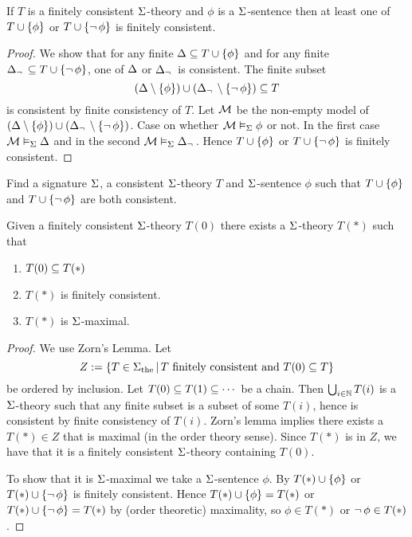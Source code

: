 \begin{lem}
    If $T$ is a finitely consistent $\Sigma$-theory 
    and $\phi$ is a $\Sigma$-sentence then at least one of
    $T \cup \left\{\phi\right\}$ or $T \cup \left\{\neg\, \phi\right\}$ is finitely consistent.
\end{lem}
\begin{proof}
    We show that for any finite $\Delta \subseteq T \cup \left\{\phi\right\}$ and 
    for any finite $\Delta_\neg\, \subseteq T \cup \left\{\neg\, \phi\right\}$,
    one of $\Delta$ or $\Delta_\neg\,$ is consistent. 
    The finite subset
    \[(\Delta \setminus \left\{\phi\right\}) \cup 
    (\Delta_\neg\, \setminus \left\{\neg\, \phi\right\}) \subseteq T\]
    is consistent by finite consistency of $T$.
    Let $\mathcal{M}$ be the non-empty model of 
    $(\Delta \setminus \left\{\phi\right\}) \cup 
    (\Delta_\neg\, \setminus \left\{\neg\, \phi\right\})$.
    Case on whether $\mathcal{M} \vDash_{\Sigma} \phi$ or not.
    In the first case $\mathcal{M} \vDash_{\Sigma} \Delta$
    and in the second $\mathcal{M} \vDash_{\Sigma} \Delta_\neg\,$.
    Hence $T \cup \left\{\phi\right\}$ or $T \cup \left\{\neg\, \phi\right\}$ 
    is finitely consistent.
\end{proof}

\begin{ex}
    Find a signature $\Sigma$, a consistent $\Sigma$-theory $T$
    and $\Sigma$-sentence $\phi$ such that  
    $T \cup \left\{\phi\right\}$ and 
    $T \cup \left\{\neg\, \phi\right\}$ are both consistent.
\end{ex}
    
\begin{prop}
    Given a finitely consistent $\Sigma$-theory $T(0)$
    there exists a $\Sigma$-theory $T(*)$ such that 
    \begin{enumerate}
        \item $T(0) \subseteq T(*)$
        \item $T(*)$ is finitely consistent.
        \item $T(*)$ is $\Sigma$-maximal.
    \end{enumerate}
\end{prop}
\begin{proof}
    We use Zorn's Lemma.
    Let 
    \[Z := \left\{T \in {\Sigma}_\mathrm{the} \,|\, T 
    \text{ finitely consistent and } T(0) \subseteq T\right\}\]
    be ordered by inclusion.
    Let $T(0) \subseteq T(1) \subseteq \cdots $ be a chain.
    Then $\bigcup_{i \in \mathbb{N}} T(i)$ is a $\Sigma$-theory
    such that any finite subset is a subset of some $T(i)$,
    hence is consistent by finite consistency of $T(i)$.
    Zorn's lemma implies there exists a $T(*) \in Z$
    that is maximal (in the order theory sense).
    Since $T(*)$ is in $Z$, 
    we have that it is a finitely consistent $\Sigma$-theory containing $T(0)$.
    
    To show that it is $\Sigma$-maximal we take a $\Sigma$-sentence $\phi$.
    By  
    $T(*) \cup \left\{\phi\right\}$ or 
    $T(*) \cup \left\{\neg\, \phi\right\}$ is finitely consistent.
    Hence 
    $T(*) \cup \left\{\phi\right\} = T(*)$ or 
    $T(*) \cup \left\{\neg\, \phi\right\} = T(*)$ by (order theoretic) maximality,
    so $\phi \in T(*)$ or $\neg\, \phi \in T(*)$.
\end{proof}

